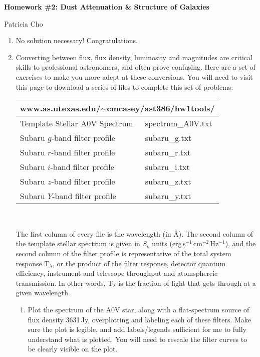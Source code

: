 \documentclass[11pt]{article}
\begin{document}
\begin{center}
\textbf{\large Homework \#2: Dust Attenuation \& Structure of Galaxies}\\
\vspace{2mm}

{\sc Patricia Cho}
\end{center}
\vspace{4mm}

\begin{enumerate}
\item No solution necessary! Congratulations.

\item Converting between flux, flux density, luminosity and magnitudes
  are critical skills to professional astronomers, and often prove
  confusing.  Here are a set of exercises to make you more adept at
  these conversions.  You will need to visit this page to download a
  series of files to complete this set of problems:\\
  \begin{center}
\vspace{-0.5cm}
  \begin{tabular}{|l|l|}
    \multicolumn{2}{c}{www.as.utexas.edu/$\sim$cmcasey/ast386/hw1tools/}\\
    \hline
    Template Stellar A0V Spectrum & spectrum\_A0V.txt \\
    \hline
    Subaru $g$-band filter profile & subaru\_g.txt \\
    \hline
    Subaru $r$-band filter profile & subaru\_r.txt \\
    \hline
    Subaru $i$-band filter profile & subaru\_i.txt \\
    \hline
    Subaru $z$-band filter profile & subaru\_z.txt \\
    \hline
    Subaru $Y$-band filter profile & subaru\_y.txt \\
    \hline
  \end{tabular}\\
  \end{center}
  The first column of every file is the wavelength (in \AA).  The
  second column of the template stellar spectrum is given in $S_{\nu}$
  units (erg\,s$^{-1}$\,cm$^{-2}$\,Hz$^{-1}$), and the second column
  of the filter profile is representative of the total system response
  T$_\lambda$, or the product of the filter response, detector quantum
  efficiency, instrument and telescope throughput and atomsphereic
  transmission.  In other words, T$_\lambda$ is the fraction of light
  that gets through at a given wavelength.
  \begin{enumerate}
    \item Plot the spectrum of the A0V star, along with a
      flat-spectrum source of flux density 3631\,Jy, overplotting and
      labeling each of these filters.  Make sure the plot is legible,
      and add labels/legends sufficient for me to fully understand
      what is plotted.  You will need to rescale the filter curves to
      be clearly visible on the plot.


\end{enumerate}
\end{enumerate}
\end{document}
